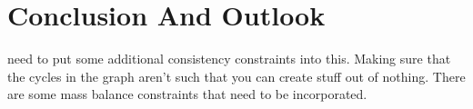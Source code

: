\chapter{Conclusion And Outlook}
{\color{red}
need to put some additional consistency constraints into this.
Making sure that the cycles in the graph aren't such that you can create stuff out of nothing. There are some mass balance constraints that need to be incorporated.
}